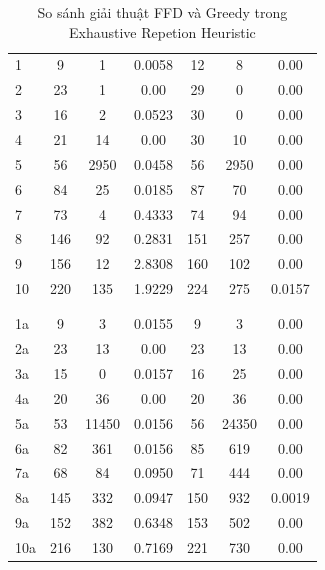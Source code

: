 \documentclass[a4paper]{article}
\begin{document}
\begin{table}[h]
\begin{tabular}{@{}l|ccc|ccc@{}}
\\
\hline
\\
\midrule
1  & 9 & 1 & 0.0058  &   12 & 8  & 0.00 \\
2  & 23 & 1 & 0.00  & 29 & 0 & 0.00 \\
3  & 16 & 2 & 0.0523  & 30 & 0  & 0.00 \\
4  & 21 & 14 & 0.00  & 30 & 10 & 0.00 \\
5  & 56 & 2950  & 0.0458 & 56 & 2950 & 0.00 \\
6  & 84 & 25  & 0.0185 & 87 & 70& 0.00 \\
7  & 73 & 4  & 0.4333 & 74 & 94 & 0.00 \\
8  & 146 & 92  & 0.2831 & 151 & 257 & 0.00 \\
9  & 156 & 12  & 2.8308 & 160  & 102 & 0.00 \\
10  & 220 & 135  & 1.9229 & 224 & 275 & 0.0157 \\
\\
\hline
\\
\midrule
1a  & 9 & 3  & 0.0155  & 9 & 3 & 0.00 \\
2a  & 23 & 13 & 0.00  & 23 & 13 & 0.00 \\
3a  & 15 & 0 & 0.0157  & 16 & 25 & 0.00 \\
4a  & 20 & 36 & 0.00  & 20 & 36 & 0.00 \\
5a  & 53 & 11450  & 0.0156 & 56 & 24350 & 0.00 \\
6a  & 82 & 361 & 0.0156 & 85 & 619 & 0.00 \\
7a  & 68 & 84 & 0.0950 & 71 & 444 & 0.00 \\
8a  & 145 & 332 & 0.0947 & 150 & 932  & 0.0019 \\
9a  & 152 & 382  & 0.6348 & 153  & 502  & 0.00 \\
10a  & 216 & 130 & 0.7169 & 221  & 730 & 0.00 \\
\bottomrule
\end{tabular}
\caption{So sánh giải thuật FFD và Greedy trong Exhaustive Repetion Heuristic}
\end{table}
\end{document}
